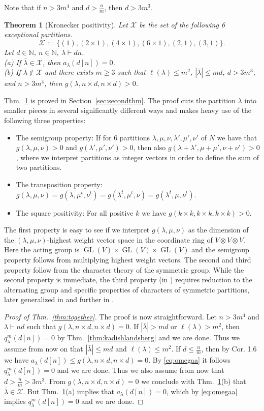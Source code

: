 \documentclass{article}
\numberwithin{equation}{section}
\newtheorem{theorem}[equation]{Theorem}
\theoremstyle{definition}
\def\la{\lambda}
\newcommand{\IN}{\mathbb N}
\DeclareMathOperator{\GL}{GL}
\newcommand{\exceptions}{{\mathscr{X}}}
\begin{document}
Note that if $n>3 m^4$ and $d > \frac n m$, then $d>3 m^3$.
\begin{theorem}[Kronecker positivity]\label{thm:secondmain}
Let $\exceptions$ be the set of the following 6 exceptional partitions.
\[
\exceptions := \{(1),(2\times1),(4\times1),(6\times1),(2,1),(3,1)\}.
\]
Let $d\in\IN$, $n \in \IN$, $\la \vdash dn$.\\
(a) If $\bar\lambda\in\exceptions$, then $a_\la(d[n])=0$.\\
(b) If $\bar\lambda\notin\exceptions$ and there exists $m \geq 3$ such that 
$\ell(\la)\leq m^2$,
$|\bar\lambda|\leq md$,
$d > 3 m^3$, and
$n > 3 m^4$, then $g(\la,n\times d, n \times d)>0$.
\end{theorem}
Thm.~\ref{thm:secondmain} is proved in Section~\ref{sec:secondthm}.
The proof cuts the partition $\la$ into smaller pieces in several significantly different ways
and makes heavy use of the following three properties:
\begin{itemize}
\item The semigroup property: If for 6 partitions $\la,\mu,\nu,\la',\mu',\nu'$ of $N$ we have that
$g(\la,\mu,\nu)>0$ and $g(\la',\mu',\nu')>0$, then also $g(\la+\la',\mu+\mu',\nu+\nu')>0$,
where we interpret partitions as integer vectors in order to define the sum of two partitions.
\item The transposition property: $g(\la,\mu,\nu)=g(\la,\mu^t,\nu^t)=g(\la^t,\mu^t,\nu)=g(\la^t,\mu,\nu^t)$.
\item The square positivity: For all positive $k$ we have $g(k \times k,k\times k,k\times k)>0$.
\end{itemize}
The first property is easy to see if we interpret $g(\la,\mu,\nu)$ as the dimension of the $(\la,\mu,\nu)$-highest weight vector space in
the coordinate ring of $V \otimes V \otimes V$. Here the acting group is $\GL(V)\times\GL(V)\times\GL(V)$ and the
semigroup property follows from multiplying highest weight vectors.
The second and third property follow from the character theory of the symmetric group.
While the second property is immediate, the third property (in \cite{bb}) requires reduction to the alternating group and specific properties of characters of symmetric partitions, later generalized in \cite{ppv:14} and further in \cite{pp:14b}. 

\begin{proof}[Proof of Thm.~\ref{thm:together}]
The proof is now straightforward.
Let $n > 3m^4$ and $\lambda \vdash nd$ such that $g(\lambda, n \times d, n \times d)=0$.
If $|\bar\lambda| > md$ or $\ell(\lambda) > m^2$, then $q_\lambda^m(d[n])=0$ by Thm.~\ref{thm:kadishlandsberg} and we are done.
Thus we assume from now on that $|\bar\lambda| \leq md$ and $\ell(\lambda) \leq m^2$.
If $d \leq \frac n m$, then by Cor. 1.6 we have $a_\la(d[n])\leq g(\la,n\times d,n\times d)=0$.
By \eqref{eq:omegaa} it follows $q_\lambda^m(d[n])=0$ and we are done.
Thus we also assume from now that $d > \frac n m > 3m^3$.
From $g(\la,n\times d,n\times d)=0$ we conclude with Thm.~\ref{thm:secondmain}(b) that $\bar\la \in \exceptions$.
But Thm.~\ref{thm:secondmain}(a) implies that $a_\la(d[n])=0$, which by \eqref{eq:omegaa} implies $q_\lambda^m(d[n])=0$ and we are done.
\end{proof}
\end{document}

